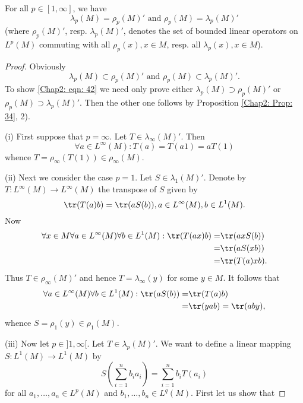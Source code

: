 \begin{proposition}\label{Chap2: Prop: 35}
    For all $p\in [1,\infty]$, we have
    \begin{equation}\label{Chap2: eqn: 42}
        \lambda_p(M)=\rho_p(M)' \text{ and } \rho_p(M)=\lambda_p(M)'
    \end{equation}
    (where $\rho_p(M)'$, resp. $\lambda_p(M)'$, denotes the set of bounded linear operators on $L^p(M)$ commuting with all $\rho_p(x),x\in M$, resp. all $\lambda_p(x), x\in M$).
\end{proposition}
\begin{proof}
    Obviously
    \[
        \lambda_p(M)\subset \rho_p(M)' \text{ and } \rho_p(M)\subset \lambda_p(M)'.
    \]
    To show \eqref{Chap2: eqn: 42} we need only prove either $\lambda_p(M)\supset \rho_p(M)'$ or $\rho_p(M)\supset \lambda_p(M)'$. Then the other one follows by Proposition \ref{Chap2: Prop: 34}, 2).\par
    (i) First suppose that $p=\infty$. Let $T\in \lambda_\infty(M)'$. Then
    \[
        \forall a\in L^\infty(M): T(a)=T(a1)=aT(1)
    \]
    whence $T=\rho_\infty(T(1))\in \rho_\infty(M)$.\par
    (ii) Next we consider the case $p = 1$. Let $S\in \lambda_1(M)'$. Denote by $T:L^\infty(M)\to L^\infty(M)$ the transpose of $S$ given by
    \[
        \tr(T(a)b)=\tr(aS(b)),a\in L^\infty(M),b\in L^1(M).
    \]
    Now
    \[
        \begin{split}
            \forall x\in M \forall a\in L^\infty(M)\forall b\in L^1(M): \tr(T(ax)b)=&\tr(axS(b))\\
            =&\tr(aS(xb))\\
            =&\tr(T(a)xb).
        \end{split}
    \]
    Thus $T\in \rho_\infty(M)'$ and hence $T=\lambda_\infty(y)$ for some $y\in M$. It follows that
    \[
        \begin{split}
            \forall a\in L^\infty(M) \forall b\in L^1(M):\tr(aS(b))=&\tr(T(a)b)\\
            =&\tr(yab)=\tr(aby),
        \end{split}
    \]
    whence $S=\rho_1(y)\in \rho_1(M)$.\par
    (iii) Now let $p\in]1,\infty[$. Let $T\in \lambda_p(M)'$. We want to define a linear mapping $S:L^1(M)\to L^1(M)$ by
    \begin{equation}
        S\left( \sum_{i=1}^n b_ia_i \right)=\sum_{i=1}^nb_iT(a_i)
    \end{equation}
    for all $a_1,\dots,a_n\in L^p(M)$ and  $b_1,\dots,b_n\in L^q(M)$. First let us show that

\end{proof}
